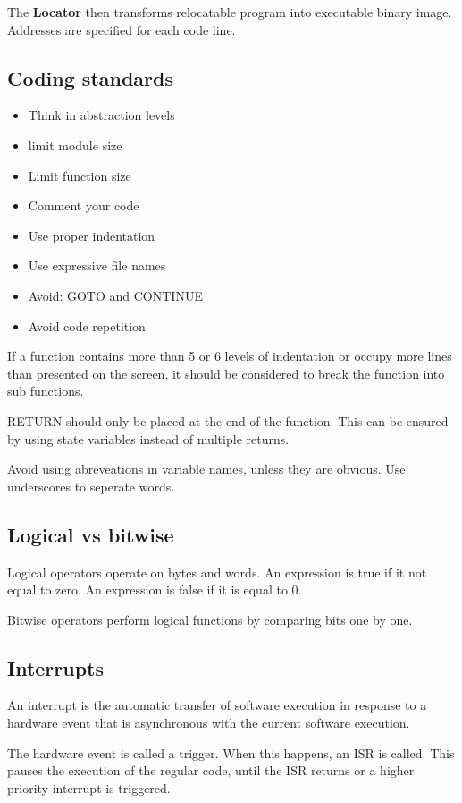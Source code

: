 The \textbf{Locator} then transforms relocatable program into executable
binary image. Addresses are specified for each code line.


\subsection{Coding standards}
\begin{itemize}
	\item Think in abstraction levels
	\item limit module size
	\item Limit function size
	\item Comment your code
	\item Use proper indentation
	\item Use expressive file names
	\item Avoid: GOTO and CONTINUE
	\item Avoid code repetition
\end{itemize}

If a function contains more than 5 or 6 levels of indentation
or occupy more lines than presented on the screen, it should
be considered to break the function into sub functions.


RETURN should only be placed at the end of the function.
This can be ensured by using state variables instead of multiple
returns.

Avoid using abreveations in variable names, unless they are obvious.
Use underscores to seperate words.


\subsection{Logical vs bitwise}

Logical operators operate on bytes and words.
An expression is true if it not equal to zero. An expression is false
if it is equal to 0.

Bitwise operators perform logical functions by comparing bits one by one.



\subsection{Interrupts}
An interrupt is the automatic transfer of software execution in response to a hardware event that is asynchronous with the current software execution.

The hardware event is called a trigger. When this happens, an ISR is called.
This pauses the execution of the regular code, until the ISR returns or a
higher priority interrupt is triggered.


